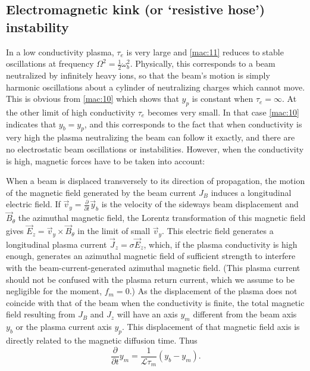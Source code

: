 \documentclass [12pt,a4paper,     ]{report} %
\newcommand{\Oh}{\tfrac{1}{2}}        %
\begin{document}
\subsection{Electromagnetic kink (or `resistive hose') instability}


	In a low conductivity plasma, $\tau_e$ is very large and \eqref{mac:11} reduces to stable oscillations at frequency $\Omega^2 = \Oh\omega_b^2$.   Physically, this corresponds to a beam neutralized by infinitely heavy ions, so that the beam's motion is simply harmonic oscillations about a cylinder of neutralizing charges which cannot move.  This is obvious from \eqref{mac:10} which shows that $y_p$ is constant when $\tau_e = \infty$.  At the other limit of high conductivity $\tau_e$ becomes very small.  In that case \eqref{mac:10} indicates that $y_b = y_p$, and this corresponds to the fact that when conductivity is very high the plasma neutralizing the beam can follow it exactly, and there are no electrostatic beam oscillations or instabilities.  However, when the conductivity is high, magnetic forces have to be taken into account:

	When a beam is displaced transversely to its direction of propagation, the motion of the magnetic field generated by the beam current $J_B$ induces a longitudinal electric field.  If  $\vec{v}_y = \frac{\partial}{\partial t} \vec{y}_b$ is the velocity of the sideways beam displacement and $\vec{B}_\theta$ the azimuthal magnetic field, the Lorentz transformation of this magnetic field gives $\vec{E}_z = \vec{v}_y\times \vec{B}_\theta$ in the limit of small $\vec{v}_y$.   This electric field generates a longitudinal plasma current $\vec{J}_z = \sigma \vec{E}_z$, which, if the plasma conductivity is high enough, generates an azimuthal magnetic field of sufficient strength to interfere with the beam-current-generated azimuthal magnetic field.  (This plasma current should not be confused with the plasma return current, which we assume to be negligible for the moment, $f_m = 0$.)  As the displacement of the plasma does not coincide with that of the beam when the conductivity is finite, the total magnetic field resulting from $J_B$ and $J_z$ will have an axis $y_m$ different from the beam axis $y_b$ or the plasma current axis $y_p$.  This displacement of that magnetic field axis is directly related to the magnetic diffusion time.  Thus
%
\begin{equation}\label{mac:14} %
  \frac{\partial}{\partial t} y_m = \frac{1}{\mathcal{L}\tau_m} (y_b - y_m).
\end{equation}
%
\end{document}
